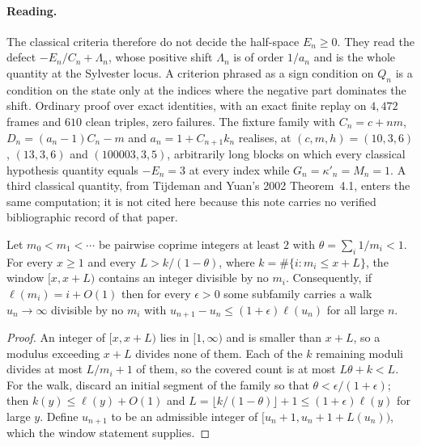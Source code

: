 \paragraph{Reading.}
The classical criteria therefore do not decide the half-space $E_n\ge0$.  They
read the defect $-E_n/C_n+\Lambda_n$, whose positive shift $\Lambda_n$ is of
order $1/a_n$ and is the whole quantity at the Sylvester locus.  A criterion
phrased as a sign condition on $Q_n$ is a condition on the state only at the
indices where the negative part dominates the shift.  Ordinary proof over exact
identities, with an exact finite replay on $4{,}472$ frames and $610$ clean
triples, zero failures.  The fixture family with $C_n=c+nm$,
$D_n=(a_n-1)C_n-m$ and $a_n=1+C_{n+1}k_n$ realises, at $(c,m,h)=(10,3,6)$,
$(13,3,6)$ and $(100003,3,5)$, arbitrarily long blocks on which every classical
hypothesis quantity equals $-E_n=3$ at every index while
$G_n=\kappa'_n=M_n=1$.  A third classical quantity, from Tijdeman and Yuan's
2002 Theorem~4.1, enters the same computation; it is not cited here because
this note carries no verified bibliographic record of that paper.

\begin{proposition}\label{long243:res:coprimalitycap}
Let $m_0<m_1<\cdots$ be pairwise coprime integers at least $2$ with
$\theta=\sum_i1/m_i<1$.  For every $x\ge1$ and every $L>k/(1-\theta)$, where
$k=\#\{i:m_i\le x+L\}$, the window $[x,x+L)$ contains an integer divisible by
no $m_i$.  Consequently, if $\ell(m_i)=i+O(1)$ then for every $\epsilon>0$ some
subfamily carries a walk $u_n\to\infty$ divisible by no $m_i$ with
$u_{n+1}-u_n\le(1+\epsilon)\ell(u_n)$ for all large $n$.
\end{proposition}

\begin{proof}
An integer of $[x,x+L)$ lies in $[1,\infty)$ and is smaller than $x+L$, so a
modulus exceeding $x+L$ divides none of them.  Each of the $k$ remaining
moduli divides at most $L/m_i+1$ of them, so the covered count is at most
$L\theta+k<L$.  For the walk, discard an initial segment of the family so that
$\theta<\epsilon/(1+\epsilon)$; then $k(y)\le\ell(y)+O(1)$ and
$L=\lfloor k/(1-\theta)\rfloor+1\le(1+\epsilon)\ell(y)$ for large $y$.  Define
$u_{n+1}$ to be an admissible integer of $[u_n+1,u_n+1+L(u_n))$, which the
window statement supplies.
\end{proof}

